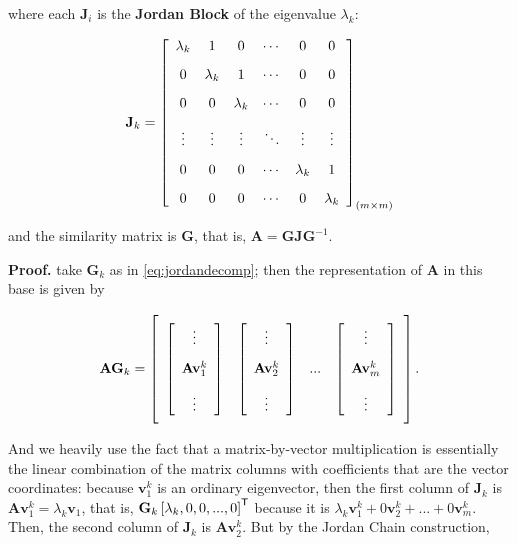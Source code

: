 \begin{theorem}
	\noindent where each $\mathbf{J}_i$ is the \textbf{Jordan Block} of the eigenvalue $\lambda_k$:

\begin{equation}
	\mathbf{J}_k = \left[\raisebox{15mm}{} \begin{array}{cccccc} \lambda_k & 1 & 0 & \cdots & 0 & 0 \\[3mm] 0 & \lambda_k & 1 & \cdots & 0 & 0 \\[3mm] 0 & 0 &  \lambda_k & \cdots & 0 & 0 \\[3mm] \vdots & \vdots & \vdots & \ddots & \vdots & \vdots \\[3mm] 0 & 0 & 0 & \cdots & \lambda_k & 1 \\[3mm] 0 & 0 & 0 & \cdots & 0 & \lambda_k\end{array}\right]_{(m\times m)}
\end{equation}

	\noindent and the similarity matrix is $\mathbf{G}$, that is, $\mathbf{A} = \mathbf{GJG}^{-1}$.
\end{theorem}
\noindent\textbf{Proof.} take $\mathbf{G}_k$ as in \eqref{eq:jordandecomp}; then the representation of $\mathbf{A}$ in this base is given by

\begin{equation} \mathbf{A}\mathbf{G}_k = \left[\raisebox{15mm}{} \begin{array}{cccc} \left[\begin{array}{c} \vdots \\[3mm] \mathbf{A}\mathbf{v}_1^k \\[3mm] \vdots \end{array}\right] & \left[\begin{array}{c} \vdots \\[3mm] \mathbf{A}\mathbf{v}_2^k \\[3mm] \vdots \end{array}\right] & ... & \left[\begin{array}{c} \vdots \\[3mm] \mathbf{A}\mathbf{v}_{m}^k \\[3mm] \vdots \end{array}\right]\end{array}\right] .\end{equation}

	And we heavily use the fact that a matrix-by-vector multiplication is essentially the linear combination of the matrix columns with coefficients that are the vector coordinates: because $\mathbf{v}_1^k$ is an ordinary eigenvector, then the first column of $\mathbf{J}_k$ is $\mathbf{A}\mathbf{v}_1^k = \lambda_k \mathbf{v}_1$, that is, $\mathbf{G}_k\left[\lambda_k,0,0,...,0\right]^{\mathsf{T}} $ because it is $\lambda_k\mathbf{v}_1^k + 0\mathbf{v}_2^k + ... + 0\mathbf{v}_{m}^k$. Then, the second column of $\mathbf{J}_k$ is $\mathbf{A}\mathbf{v}_2^k$. But by the Jordan Chain construction,

